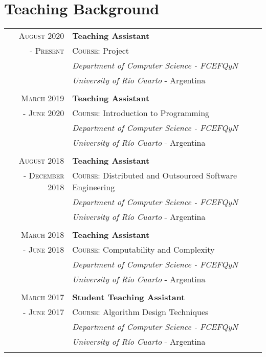 \documentclass[a4paper,10pt]{article} %
\begin{document}
\section{Teaching Background}
\begin{longtable}{rl}
\textsc{August 2020} & \textbf{Teaching Assistant} \\
\textsc{- Present} & \textsc{Course:} Project \\
& \textit{Department of Computer Science - FCEFQyN} \\
& \textit{University of Río Cuarto} - Argentina \\ & \\

\textsc{March 2019} & \textbf{Teaching Assistant} \\
\textsc{- June 2020} & \textsc{Course:} Introduction to Programming \\ 
& \textit{Department of Computer Science - FCEFQyN} \\  
& \textit{University of Río Cuarto} - Argentina \\ & \\

\textsc{August 2018} & \textbf{Teaching Assistant} \\
\textsc{- December 2018} & \textsc{Course:} Distributed and Outsourced Software Engineering \\ 
& \textit{Department of Computer Science - FCEFQyN} \\  
& \textit{University of Río Cuarto} - Argentina \\ & \\

\textsc{March 2018} & \textbf{Teaching Assistant} \\
\textsc{- June 2018} & \textsc{Course:} Computability and Complexity \\ 
& \textit{Department of Computer Science - FCEFQyN} \\  
& \textit{University of Río Cuarto} - Argentina \\ & \\

\textsc{March 2017} & \textbf{Student Teaching Assistant} \\
\textsc{- June 2017} & \textsc{Course:} Algorithm Design Techniques \\ 
& \textit{Department of Computer Science - FCEFQyN} \\  
& \textit{University of Río Cuarto} - Argentina \\ & \\


\end{longtable}
\end{document}
